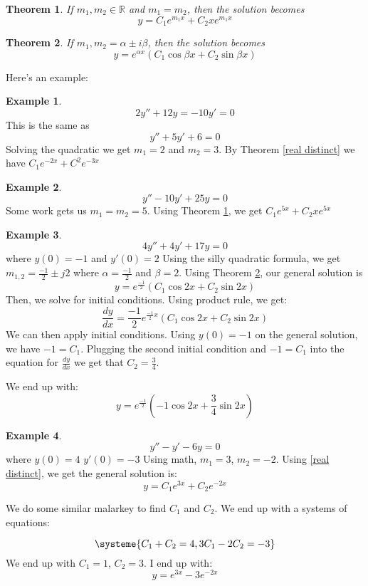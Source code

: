\documentclass{article}
\newtheorem{thm}{Theorem}
\theoremstyle{definition}
\newtheorem{example}{Example}[section]
\begin{document}
\begin{thm} \label{real repeated}
If $m_1, m_2 \in \mathbb{R}$ and $m_1 = m_2$, then the solution becomes 
    \[ 
    y = C_1e^{m_1x}+C_2xe^{m_1x}
    \]
\end{thm}

\begin{thm} \label{complex}
    If $m_1, m_2 = \alpha \pm i\beta$, then the solution becomes 
        \[ 
        y = e^{\alpha x}(C_1\cos{\beta x} + C_2\sin{\beta x})
        \]
    \end{thm}

Here's an example:
\begin{example}
    \[ 2y'' + 12y = -10y' = 0\] 
    This is the same as 
    \[ y'' + 5y' + 6 = 0\] 
    Solving the quadratic we get $m_1 = 2$ and $m_2 = 3$. 
    By Theorem \ref{real distinct} we have $C_1 e^{-2x} + C^2e^{-3x}$
\end{example}  

\begin{example}
\[y'' - 10 y'+ 25 y = 0\]
Some work gets us $m_1 = m_2 = 5$. Using Theorem \ref{real repeated}, we get $C_1e^{5x} + C_2xe^{5x}$
\end{example}

\begin{example}
\[4y'' + 4y'+ 17y = 0\]
where $y(0) = -1$ and $y'(0) = 2$
Using the silly quadratic formula, we get $m_{1,2} = \frac{-1}{2} \pm j2$
where $\alpha = \frac{-1}{2}$ and $\beta = 2$. Using Theorem \ref{complex}, our general solution is 
\[ 
y = e^\frac{-1}{2}(C_1\cos{2 x} + C_2\sin{2 x})
\]
Then, we solve for initial conditions. Using product rule, we get:
\[ 
\frac{dy}{dx} = \frac{-1}{2}e^{\frac{-1}{2}x}(C_1\cos{2x}+C_2\sin{2x})
\]
We can then apply initial conditions. Using $y(0) = -1$ on the general solution, we have $-1 = C_1$. Plugging the second initial condition and $-1 = C_1$ into the equation for $\frac{dy}{dx}$ we get that $C_2 = \frac{3}{4}$. 

We end up with:
\[
    y = e^\frac{-1}{2}(-1\cos{2 x} + \frac{3}{4}\sin{2 x})
\]
\end{example}

\begin{example}
    \[ 
    y'' - y' - 6y = 0
    \] 
    where $y(0) = 4$ $y'(0) = -3$
Using math, $m_1 = 3$, $m_2 = -2$. Using \ref{real distinct}, we get the general solution is:
\[ 
    y = C_1e^{3x}+C_2e^{-2x}
\]

We do some similar malarkey to find $C_1$ and $C_2$. We end up with a systems of equations: 

\begin{equation*}
    \systeme{
    C_1 + C_2 = 4,
    3C_1 - 2C_2 = -3
    }
  \end{equation*}
  We end up with $C_1 = 1$, $C_2 = 3$. I end up with:
\[ 
    y = e^{3x}-3e^{-2x}
\]

\end{example}
\end{document}
